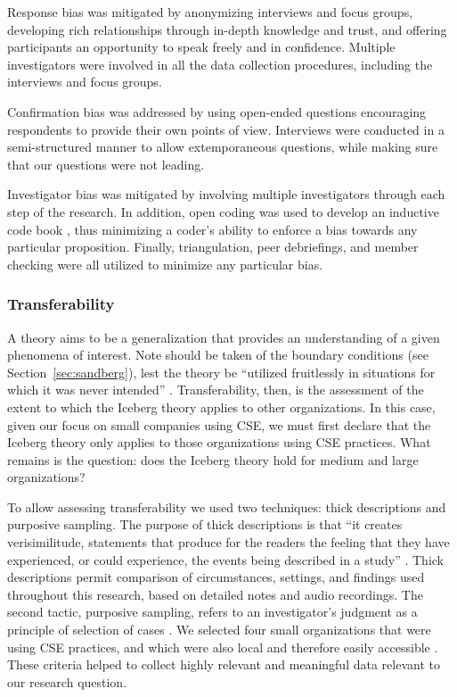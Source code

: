 \documentclass[smallextended]{svjour3}        %
\begin{document}
{Response bias} was mitigated by anonymizing interviews and focus groups, developing rich relationships through in-depth knowledge and trust, and offering participants an opportunity to speak freely and in confidence.
Multiple investigators were involved in all the data collection procedures, including the interviews and focus groups. 

{Confirmation bias} was addressed by using open-ended questions encouraging respondents to provide their own points of view. 
Interviews were conducted in a semi-structured manner to allow extemporaneous questions,  
while making sure that our questions were not leading.

{Investigator bias} was mitigated by involving multiple investigators through each step of the research.
In addition, open coding \citep{corbin1990grounded} was used to develop an inductive code book \citep{cruzes_recommended_2011}, thus minimizing a coder's ability to enforce a bias towards any particular proposition.
Finally, triangulation, peer debriefings, and member checking were all utilized to minimize any particular bias.


\subsubsection{Transferability}
A theory aims to be a generalization that provides an understanding of a given phenomena of interest. Note should be taken of the boundary conditions (see Section~\ref{sec:sandberg}), lest the theory be ``utilized fruitlessly in situations for which it was never intended'' \cite[p. 8]{miner1980}.
Transferability, then, is the assessment of the extent to which the Iceberg theory applies to other organizations. In this case, given our focus on small companies using CSE, we must first declare that the Iceberg theory only applies to those organizations using CSE practices. What remains is the question: does the Iceberg theory hold for medium and large organizations? 

To allow assessing transferability we used two techniques: thick descriptions \citep{geertz2008thick} and purposive sampling.
The purpose of thick descriptions is that ``it creates verisimilitude, statements that produce for the readers the feeling that they have experienced, or could experience, the events being described in a study'' \citep{creswell2000determining}. 
Thick descriptions permit comparison of circumstances, settings, and findings used throughout this research, based on detailed notes and audio recordings. 
The second tactic, purposive sampling, refers to an investigator's judgment as a principle of selection of cases \citep{robson2002}. We selected four small organizations that were using CSE practices, and which were also local and therefore easily accessible \citep{miles1994qualitative}. These criteria helped to collect highly relevant and meaningful data relevant to our research question.
\end{document}

